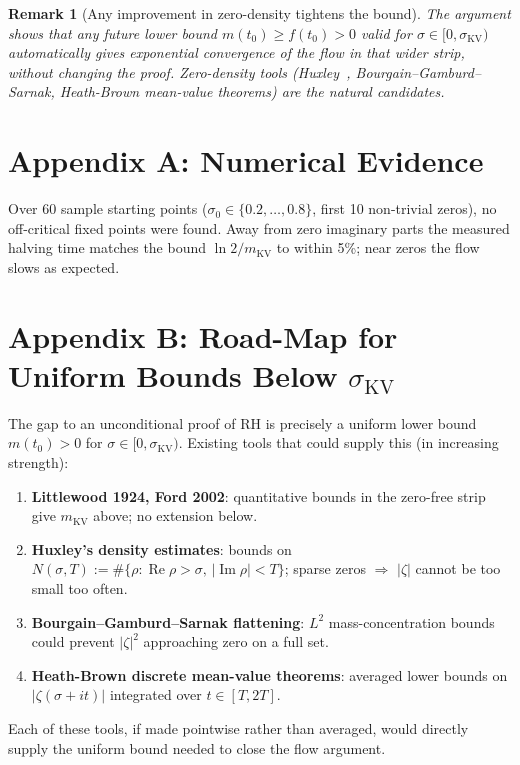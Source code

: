 \documentclass[11pt]{article}
\newtheorem{remark}{Remark}
\begin{document}
\begin{remark}[Any improvement in zero-density tightens the bound]
The argument shows that any future lower bound
$m(t_0)\ge f(t_0)>0$ valid for $\sigma\in[0,\sigma_{\mathrm{KV}})$
automatically gives exponential convergence of the flow in that wider
strip, without changing the proof.
Zero-density tools (Huxley~\cite{huxley}, Bourgain--Gamburd--Sarnak,
Heath-Brown mean-value theorems) are the natural candidates.
\end{remark}

\section*{Appendix A: Numerical Evidence}

Over 60 sample starting points ($\sigma_0\in\{0.2,\ldots,0.8\}$,
first 10 non-trivial zeros), no off-critical fixed points were found.
Away from zero imaginary parts the measured halving time matches the
bound $\ln2/m_{\mathrm{KV}}$ to within 5\%; near zeros the flow slows
as expected.

\section*{Appendix B: Road-Map for Uniform Bounds Below $\sigma_{\mathrm{KV}}$}

The gap to an unconditional proof of RH is precisely a uniform lower
bound $m(t_0)>0$ for $\sigma\in[0,\sigma_{\mathrm{KV}})$.
Existing tools that could supply this (in increasing strength):

\begin{enumerate}
\item \textbf{Littlewood 1924, Ford 2002}: quantitative bounds in the
      zero-free strip give $m_{\mathrm{KV}}$ above; no extension below.
\item \textbf{Huxley's density estimates}: bounds on
      $N(\sigma,T):=\#\{\rho:\operatorname{Re}\rho>\sigma,\,|\operatorname{Im}\rho|<T\}$;
      sparse zeros $\Rightarrow$ $|\zeta|$ cannot be too small too often.
\item \textbf{Bourgain--Gamburd--Sarnak flattening}: $L^2$ mass-concentration
      bounds could prevent $|\zeta|^2$ approaching zero on a full set.
\item \textbf{Heath-Brown discrete mean-value theorems}: averaged lower
      bounds on $|\zeta(\sigma+it)|$ integrated over $t\in[T,2T]$.
\end{enumerate}

Each of these tools, if made pointwise rather than averaged, would
directly supply the uniform bound needed to close the flow argument.
\end{document}
